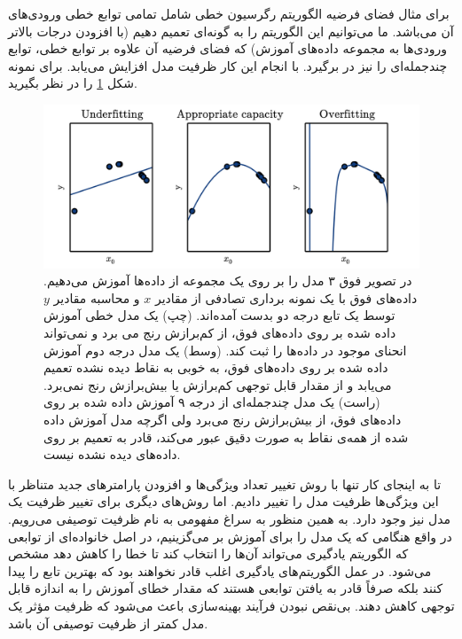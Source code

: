 برای مثال فضای فرضیه الگوریتم رگرسیون خطی شامل تمامی توابع خطی ورودی‌های آن می‌باشد. ما می‌توانیم این الگوریتم را به گونه‌ای تعمیم دهیم (با افزودن درجات بالاتر ورودی‌ها به مجموعه‌ داده‌های آموزش) که فضای فرضیه‌ آن علاوه بر توابع خطی، توابع چندجمله‌ای را نیز در برگیرد. با انجام این کار ظرفیت مدل افزایش می‌یابد. برای نمونه شکل \ref{fig:Capacity} را در نظر بگیرید.
\begin{figure}
    \centering
    \includegraphics[width=\textwidth]{figs/Capacity.png}
    \caption{در تصویر فوق ۳ مدل را بر روی یک مجموعه از داده‌ها آموزش می‌دهیم. داده‌های فوق با یک نمونه‌ برداری تصادفی از مقادیر $x$ و محاسبه مقادیر $y$ توسط یک تابع درجه دو بدست‌ آمده‌اند. 
    (چپ)
    یک مدل خطی آموزش‌ داده شده بر روی داده‌های فوق، از کم‌برازش رنج می برد و نمی‌تواند انحنای موجود در
    داده‌ها را ثبت کند.
    (وسط)
    یک مدل درجه دوم آموزش داده شده بر روی داده‌های فوق، به خوبی به نقاط دیده نشده تعمیم می‌یابد و از مقدار قابل توجهی کم‌برازش یا بیش‌برازش رنج نمی‌برد.
    (راست)
    یک مدل چندجمله‌ای از درجه ۹ آموزش داده شده بر روی داده‌های فوق، از بیش‌برازش رنج می‌برد ولی اگرچه مدل آموزش داده شده از همه‌ی نقاط به صورت دقیق عبور می‌کند، قادر به تعمیم بر روی داده‌های دیده نشده نیست.}
    \label{fig:Capacity}
\end{figure}

تا به اینجای کار تنها با روش تغییر تعداد ویژگی‌ها و افزودن پارامتر‌های جدید متناظر با این ویژگی‌ها ظرفیت مدل را تغییر دادیم. اما روش‌های دیگری برای تغییر ظرفیت یک مدل نیز وجود دارد. به همین منظور به سراغ مفهومی به نام ظرفیت توصیفی می‌رویم. در واقع هنگامی که یک مدل را برای آموزش بر می‌گزینیم، در اصل خانواده‌ای از توابعی که الگوریتم یادگیری می‌تواند آن‌ها را انتخاب کند تا خطا را کاهش دهد مشخص می‌شود. در عمل الگوریتم‌های یادگیری اغلب قادر نخواهند بود که بهترین تابع را پیدا کنند بلکه صرفاً قادر به یافتن توابعی هستند که مقدار خطای آموزش را به اندازه قابل توجهی کاهش دهند. بی‌نقص نبودن فرآیند بهینه‌سازی باعث می‌شود که ظرفیت مؤثر یک مدل کمتر از ظرفیت توصیفی آن باشد.